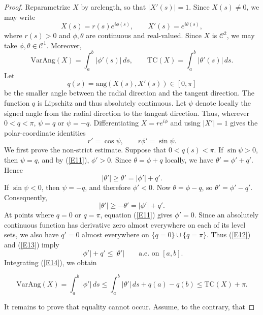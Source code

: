 \documentclass[10pt,a4paper]{amsart}
\newcommand{\ang}{\mathrm{ang}}
\newcommand{\T}{\mathrm{TC}}
\newcommand{\VA}{\mathrm{VarAng}}
\newcommand{\cC}{\mathcal{C}}
\numberwithin{equation}{section}
\begin{document}
\begin{proof}
Reparametrize $X$ by arclength, so that $|X'(s)|=1$. Since
$X(s)\neq 0$, we may write
\[
    X(s)=r(s)e^{i\phi(s)},
    \qquad
    X'(s)=e^{i\theta(s)},
\]
where $r(s)>0$ and $\phi,\theta$ are continuous and real-valued. Since $X$ is $\cC^2$, we may take $\phi,\theta\in \cC^1$. Moreover,
\[\VA(X)=\int_a^b |\phi'(s)|\,ds,\qquad \T(X)=\int_a^b |\theta'(s)|\,ds.\]
Let
\[q(s)=\ang\left(X(s),X'(s)\right)\in[0,\pi]\]
be the smaller angle between the radial direction and the tangent direction. The function $q$ is Lipschitz and thus absolutely continuous. Let $\psi$ denote locally the signed angle from the radial direction to the tangent direction. Thus, wherever $0<q<\pi$, $\psi=q$ or $\psi=-q.$
Differentiating $X=re^{i\phi}$ and using $|X'|=1$ gives the polar-coordinate identities
\begin{equation}
	r'=\cos\psi,\qquad r\phi'=\sin\psi.
    \label{E11}
\end{equation}
We first prove the non-strict estimate. Suppose that
$0<q(s)<\pi$. If $\sin\psi>0$, then $\psi=q$, and by (\ref{E11}),
$\phi'>0$. Since $\theta=\phi+q$
locally, we have $\theta'=\phi'+q'.$
Hence
\begin{equation}
	|\theta'|\ge \theta'=|\phi'|+q'.
  \label{E12}
\end{equation}
If $\sin\psi<0$, then $\psi=-q$, and therefore $\phi'<0$. Now $\theta=\phi-q$,
so $\theta'=\phi'-q'.$
Consequently,
\begin{equation}|\theta'|\ge -\theta'=|\phi'|+q'.
    \label{E13}
\end{equation}
At points where $q=0$ or $q=\pi$, equation (\ref{E11}) gives
$\phi'=0$. Since an absolutely continuous function has derivative
zero almost everywhere on each of its level sets, we also have
$q'=0$ almost everywhere on $\{q=0\}\cup\{q=\pi\}.$
Thus (\ref{E12}) and (\ref{E13}) imply
\begin{equation}|\phi'|+q'\le |\theta'|\qquad\text{a.e. on }[a,b].
    \label{E14}
\end{equation}
Integrating (\ref{E14}), we obtain

\begin{equation}
    \VA(X)=\int_a^b |\phi'|\,ds\le\int_a^b|\theta'|\,ds+q(a)-q(b)\le \T(X)+\pi .
\label{E15}
\end{equation}

It remains to prove that equality cannot occur. Assume, to the contrary, that


\end{proof}
\end{document}
